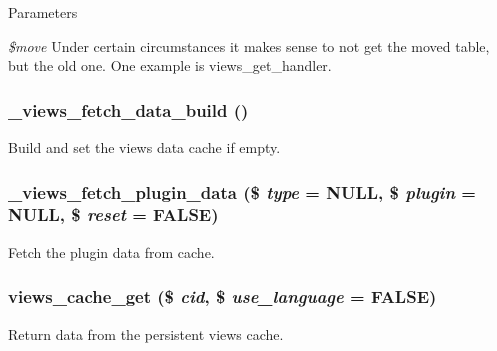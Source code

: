 \begin{DoxyParams}{Parameters}
\item[{\em \$move}]Under certain circumstances it makes sense to not get the moved table, but the old one. One example is views\_\-get\_\-handler. \end{DoxyParams}
\hypertarget{profiles_2dosomething_2modules_2contrib_2views_2includes_2cache_8inc_ab32ccf6a813b8037d2552ed0d54125f9}{
\subsubsection[{\_\-views\_\-fetch\_\-data\_\-build}]{\setlength{\rightskip}{0pt plus 5cm}\_\-views\_\-fetch\_\-data\_\-build ()}}
\label{profiles_2dosomething_2modules_2contrib_2views_2includes_2cache_8inc_ab32ccf6a813b8037d2552ed0d54125f9}
Build and set the views data cache if empty. \hypertarget{profiles_2dosomething_2modules_2contrib_2views_2includes_2cache_8inc_a70217d418b60499c49aaa469712a8501}{
\subsubsection[{\_\-views\_\-fetch\_\-plugin\_\-data}]{\setlength{\rightskip}{0pt plus 5cm}\_\-views\_\-fetch\_\-plugin\_\-data (\$ {\em type} = {\ttfamily NULL}, \/  \$ {\em plugin} = {\ttfamily NULL}, \/  \$ {\em reset} = {\ttfamily FALSE})}}
\label{profiles_2dosomething_2modules_2contrib_2views_2includes_2cache_8inc_a70217d418b60499c49aaa469712a8501}
Fetch the plugin data from cache. \hypertarget{profiles_2dosomething_2modules_2contrib_2views_2includes_2cache_8inc_a3d4e5b21bcf4c7cc327190ece3251555}{
\subsubsection[{views\_\-cache\_\-get}]{\setlength{\rightskip}{0pt plus 5cm}views\_\-cache\_\-get (\$ {\em cid}, \/  \$ {\em use\_\-language} = {\ttfamily FALSE})}}
\label{profiles_2dosomething_2modules_2contrib_2views_2includes_2cache_8inc_a3d4e5b21bcf4c7cc327190ece3251555}
Return data from the persistent views cache.

